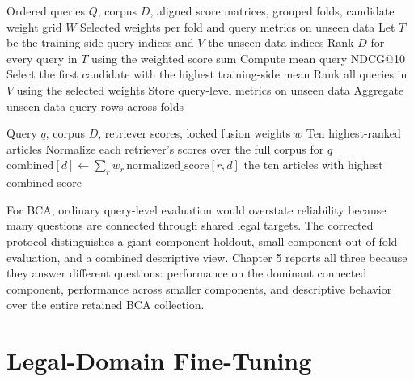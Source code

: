 \begin{algorithm}[H]
\caption{Grouped selection of fusion weights and out-of-fold evaluation}
\label{alg:grouped-fusion-selection}
\footnotesize
\begin{algorithmic}[1]
\Require Ordered queries $Q$, corpus $D$, aligned score matrices, grouped folds, candidate weight grid $W$
\Ensure Selected weights per fold and query metrics on unseen data
    \State Let $T$ be the training-side query indices and $V$ the unseen-data indices
        \State Rank $D$ for every query in $T$ using the weighted score sum
        \State Compute mean query NDCG@10
    \EndFor
    \State Select the first candidate with the highest training-side mean
    \State Rank all queries in $V$ using the selected weights
    \State Store query-level metrics on unseen data
\EndFor
\State Aggregate unseen-data query rows across folds
\end{algorithmic}
\end{algorithm}

\begin{algorithm}[H]
\caption{Article ranking with a locked hybrid configuration}
\label{alg:locked-hybrid-ranking}
\footnotesize
\begin{algorithmic}[1]
\Require Query $q$, corpus $D$, retriever scores, locked fusion weights $w$
\Ensure Ten highest-ranked articles
\State Normalize each retriever's scores over the full corpus for $q$
    \State $\mathrm{combined}[d]\gets\sum_r w_r\,\mathrm{normalized\_score}[r,d]$
\EndFor
\State \Return the ten articles with highest combined score
\end{algorithmic}
\end{algorithm}

For BCA, ordinary query-level evaluation would overstate reliability because many questions are connected through shared legal targets. The corrected protocol distinguishes a giant-component holdout, small-component out-of-fold evaluation, and a combined descriptive view. Chapter 5 reports all three because they answer different questions: performance on the dominant connected component, performance across smaller components, and descriptive behavior over the entire retained BCA collection.

\section{Legal-Domain Fine-Tuning}

